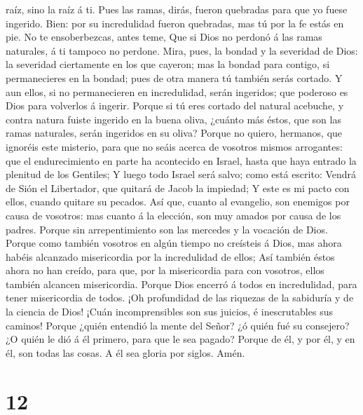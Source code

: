raíz, sino la raíz á ti.  Pues las ramas, dirás, fueron
quebradas para que yo fuese ingerido.  Bien: por su
incredulidad fueron quebradas, mas tú por la fe estás en pie. No te
ensoberbezcas, antes teme,  Que si Dios no perdonó á las
ramas naturales, á ti tampoco no perdone.  Mira, pues, la
bondad y la severidad de Dios: la severidad ciertamente en los que
cayeron; mas la bondad para contigo, si permanecieres en la bondad; pues
de otra manera tú también serás cortado.  Y aun ellos, si
no permanecieren en incredulidad, serán ingeridos; que poderoso es Dios
para volverlos á ingerir.  Porque si tú eres cortado del
natural acebuche, y contra natura fuiste ingerido en la buena oliva,
¿cuánto más éstos, que son las ramas naturales, serán ingeridos en su
oliva?  Porque no quiero, hermanos, que ignoréis este
misterio, para que no seáis acerca de vosotros mismos arrogantes: que el
endurecimiento en parte ha acontecido en Israel, hasta que haya entrado
la plenitud de los Gentiles;  Y luego todo Israel será
salvo; como está escrito: Vendrá de Sión el Libertador, que quitará de
Jacob la impiedad;  Y este es mi pacto con ellos, cuando
quitare su pecados.  Así que, cuanto al evangelio, son
enemigos por causa de vosotros: mas cuanto á la elección, son muy amados
por causa de los padres.  Porque sin arrepentimiento son
las mercedes y la vocación de Dios.  Porque como también
vosotros en algún tiempo no creísteis á Dios, mas ahora habéis alcanzado
misericordia por la incredulidad de ellos;  Así también
éstos ahora no han creído, para que, por la misericordia para con
vosotros, ellos también alcancen misericordia.  Porque Dios
encerró á todos en incredulidad, para tener misericordia de todos.
 ¡Oh profundidad de las riquezas de la sabiduría y de la
ciencia de Dios! ¡Cuán incomprensibles son sus juicios, é inescrutables
sus caminos!  Porque ¿quién entendió la mente del Señor? ¿ó
quién fué su consejero?  ¿O quién le dió á él primero, para
que le sea pagado?  Porque de él, y por él, y en él, son
todas las cosas. A él sea gloria por siglos. Amén.

\hypertarget{section-11}{%
\section{12}\label{section-11}}


